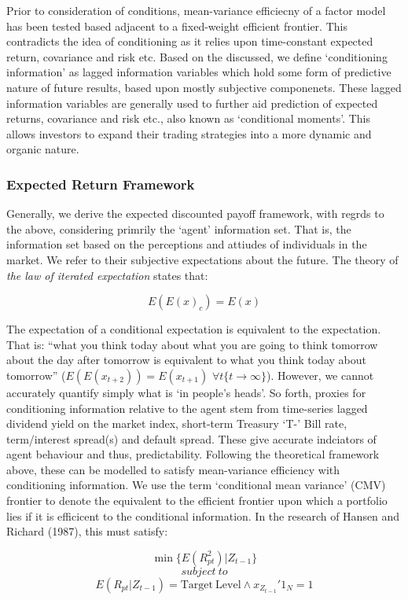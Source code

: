 \documentclass[11pt, english]{article}
\begin{document}
	Prior to consideration of conditions, mean-variance efficiecny of a factor model has been tested based adjacent to a fixed-weight efficient frontier. This contradicts the idea of conditioning as it relies upon time-constant expected return, covariance and risk etc. Based on the discussed, we define `conditioning information' as lagged information variables which hold some form of predictive nature of future results, based upon mostly subjective componenets. These lagged information variables are generally used to further aid prediction of expected returns, covariance and risk etc., also known as `conditional moments'. This allows investors to expand their trading strategies into a more dynamic and organic nature. 

	\subsubsection*{Expected Return Framework}

	Generally, we derive the expected discounted payoff framework, with regrds to the above, considering primrily the `agent' information set. That is, the information set based on the perceptions and attiudes of individuals in the market. We refer to their subjective expectations about the future. The theory of \textit{the law of iterated expectation} states that:

	$$E(E(x)_c)=E(x)$$

	The expectation of a conditional expectation is equivalent to the expectation. That is: ``what you think today about what you are going to think tomorrow about the day after tomorrow is equivalent to what you think today about tomorrow'' ($E(E(x_{t+2}))=E(x_{t+1})$ $\forall t\{t\rightarrow\infty\}$). However, we cannot accurately quantify simply what is `in people's heads'. So forth, proxies for conditioning information relative to the agent stem from time-series lagged dividend yield on the market index, short-term Treasury `T-' Bill rate, term/interest spread(s) and default spread. These give accurate indciators of agent behaviour and thus, predictability. Following the theoretical framework above, these can be modelled to satisfy mean-variance efficiency with conditioning information. We use the term `conditional mean variance' (CMV) frontier to denote the equivalent to the efficient frontier upon which a portfolio lies if it is efficicent to the conditional information. In the research of Hansen and Richard (1987), this must satisfy:

	$$\min\{E(R_{pt}^2)|Z_{t-1}\}$$
	$$subject\ to$$
	$$E(R_{pt}|Z_{t-1})=\mathrm{Target\ Level}\land x_{Z_{t-1}}'1_N=1$$
	
\end{document}
